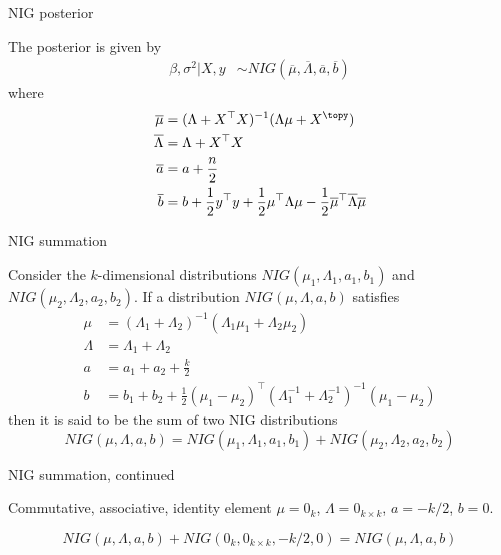 \documentclass[mathserif, 11pt, t]{beamer}
\begin{document}
\begin{frame}{NIG posterior}

The posterior is given by
\begin{align}
\beta,\sigma^2 |X, y &\sim NIG(\overline{\mu}, \overline{\Lambda}, \overline{a}, \overline{b})
\end{align}
where
\begin{align}
\begin{split}
\overline{\mu} &= (\Lambda + X^\top X)^{-1}(\Lambda \mu + X^\topy) \\
\overline{\Lambda} &= \Lambda + X^\top X \\
\overline{a} &= a + \frac{n}{2} \\
\overline{b} &= b + \frac{1}{2}y^\top y + \frac{1}{2}\mu^\top \Lambda\mu -\frac{1}{2}\overline{\mu}^\top\overline{\Lambda}\overline{\mu} 
\end{split}
\end{align}

\end{frame}


\begin{frame}{NIG summation}

Consider the $k$-dimensional distributions $NIG(\mu_1, \Lambda_1, a_1, b_1)$ and $NIG(\mu_2, \Lambda_2, a_2, b_2)$. If a distribution $NIG(\mu, \Lambda, a, b)$ satisfies
\begin{align*}
\mu &=(\Lambda_1+\Lambda_2)^{-1}(\Lambda_1\mu_1 + \Lambda_2\mu_2) \\
\Lambda &=\Lambda_1+\Lambda_2 \\
a &=a_1+a_2+\frac{k}{2} \\
b &=b_1+b_2+\frac{1}{2}(\mu_1-\mu_2)^\top(\Lambda_1^{-1}+\Lambda_2^{-1})^{-1}(\mu_1-\mu_2)
\end{align*}
then it is said to be the sum of two NIG distributions
\[ NIG(\mu, \Lambda, a, b) = NIG(\mu_1, \Lambda_1, a_1, b_1) + NIG(\mu_2, \Lambda_2, a_2, b_2) \]

\end{frame}


\begin{frame}{NIG summation, continued}

Commutative, associative, identity element $\mu=0_k$, $\Lambda=0_{k\times k}$, $a=-k/2$, $b=0$.

\[ NIG(\mu,\Lambda,a,b)+NIG(0_k, 0_{k\times k}, -k/2, 0) = NIG(\mu,\Lambda,a,b) \]


\end{frame}
\end{document}
